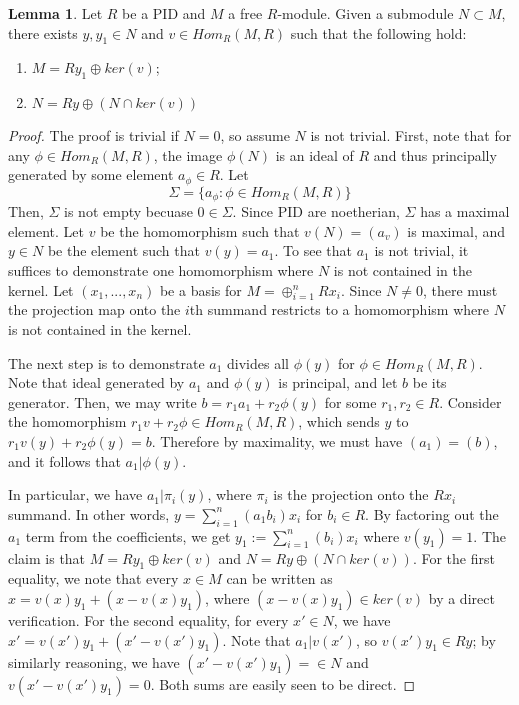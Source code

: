 \documentclass{article}
\theoremstyle{definition}
\theoremstyle{definition}
\theoremstyle{definition}
\theoremstyle{definition}
\newtheorem{lemma}[theorem]{Lemma}
\theoremstyle{definition}
\theoremstyle{definition}
\theoremstyle{definition}
\begin{document}
\begin{tcolorbox}
\begin{lemma}
Let $R$ be a PID and $M$ a free $R$-module. Given a submodule $N\subset M$, there exists $y,y_1\in N $ and $v\in Hom_R(M,R)$ such that the following hold:
\begin{enumerate}
    \item $M=Ry_1\oplus ker(v)$;
    \item $N=Ry\oplus (N\cap ker(v))$
\end{enumerate}
\end{lemma}
\end{tcolorbox}
\begin{proof}
    The proof is trivial if $N=0$, so assume $N$ is not trivial. First, note that for any $\phi\in Hom_R(M,R)$, the image $\phi(N)$ is an ideal of $R$ and thus principally generated by some element $a_{\phi}\in R$. Let \[\Sigma= \{ a_{\phi}:\phi\in Hom_R(M,R) \}\]
    Then, $\Sigma$ is not empty becuase $0\in \Sigma$. Since PID are noetherian, $\Sigma$ has a maximal element. Let $v$ be the homomorphism such that $v(N)=(a_v)$ is maximal, and $y\in N$ be the element such that $v(y)=a_1$. To see that $a_1$ is not trivial, it suffices to demonstrate one homomorphism where $N$ is not contained in the kernel. Let $(x_1,...,x_n)$ be a basis for $M=\oplus_{i=1}^n Rx_i$. Since $N\neq 0$, there must the projection map onto the $i$th summand restricts to a homomorphism where $N$ is not contained in the kernel. 
 
    The next step is to demonstrate $a_1$ divides all $\phi(y)$ for $\phi\in Hom_R(M,R)$. Note that ideal generated by $a_1$ and $\phi(y)$ is principal, and let $b$ be its generator. Then, we may write $b=r_1a_1+r_2\phi(y)$ for some $r_1,r_2\in R$. Consider the homomorphism $r_1v+r_2\phi\in Hom_R(M,R)$, which sends $y$ to $r_1v(y)+r_2\phi(y)=b$. Therefore by maximality, we must have $(a_1)=(b)$, and it follows that $a_1| \phi(y)$.
 
    In particular, we have $a_1|\pi_i(y)$, where $\pi_i$ is the projection onto the $Rx_i$ summand. In other words, $y=\sum_{i=1}^n(a_1b_i)x_i$ for $b_i\in R$. By factoring out the $a_1$ term from the coefficients, we get $y_1:=\sum_{i=1}^n(b_i)x_i$ where $v(y_1)=1$. The claim is that $M=Ry_1\oplus ker(v)$ and $N=Ry\oplus (N\cap ker(v))$. For the first equality, we note that every $x\in M$ can be written as $x=v(x)y_1+(x-v(x)y_1)$, where $(x-v(x)y_1)\in ker(v)$ by a direct verification. For the second equality, for every $x'\in N$, we have $x'=v(x')y_1+(x'-v(x')y_1)$. Note that $a_1|v(x')$, so $v(x')y_1\in Ry$; by similarly reasoning, we have $(x'-v(x')y_1)=\in N$ and $v(x'-v(x')y_1)=0$. Both sums are easily seen to be direct.
\end{proof}
\end{document}
